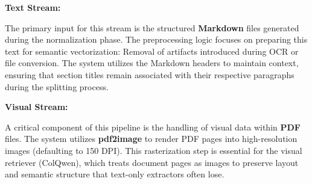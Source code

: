 \textbf{Text Stream:}


The primary input for this stream is the structured \textbf{Markdown} files generated during the normalization phase. The preprocessing logic focuses on preparing this text for semantic vectorization:
Removal of artifacts introduced during OCR or file conversion.
The system utilizes the Markdown headers to maintain context, ensuring that section titles remain associated with their respective paragraphs during the splitting process.

\textbf{Visual Stream:}

A critical component of this pipeline is the handling of visual data within \textbf{PDF} files. The system utilizes \textbf{pdf2image} to render PDF pages into high-resolution images (defaulting to 150 DPI). This rasterization step is essential for the visual retriever (ColQwen), which treats document pages as images to preserve layout and semantic structure that text-only extractors often lose.



